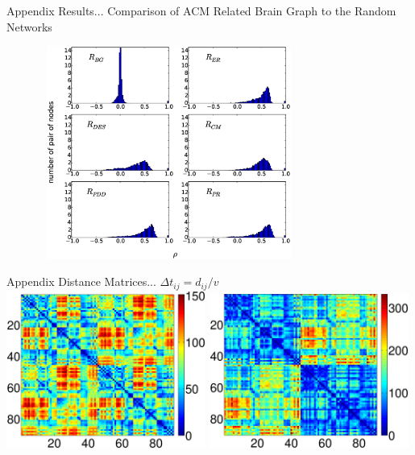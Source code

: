 \documentclass{beamer}
\begin{document}
\begin{frame}{Appendix}
Results...
\footnotesize{Comparison of ACM Related Brain Graph to the Random Networks}

\includegraphics[width=0.8\textwidth, height = 7cm]{Figures/Random_ACM_histo.eps}

\end{frame}




\begin{frame}{Appendix}
Distance Matrices... $\Delta t_{ij} = d_{ij} / v$
 \centering
	 \includegraphics[width=0.49\textwidth]{Figures/distance_FCM.eps}
	\includegraphics[width=0.49\textwidth]{Figures/distance_ACM.eps}		

\end{frame}
\end{document}
